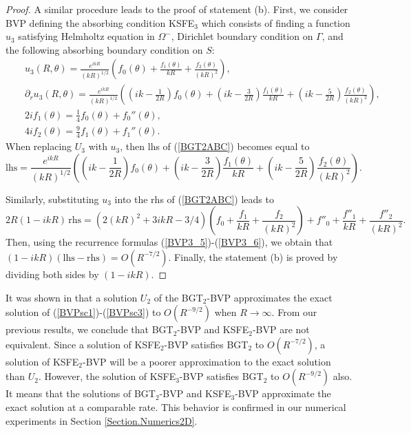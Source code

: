 \documentclass[final,3p,times,12pt]{elsarticle}
\begin{document}
\begin{proof}
A similar procedure leads to the proof of statement (b). First, we consider BVP defining the absorbing condition KSFE$_3$ which consists of finding a function $u_3$ satisfying Helmholtz equation in $\Omega^{-}$, Dirichlet boundary condition on $\Gamma$, and the following absorbing boundary condition on $S$:
\begin{eqnarray}
&& u_3(R,\theta)= \frac{e^{ikR}}{(kR)^{1/2}}\left(f_0(\theta) + \frac{f_1(\theta)}{kR} +  \frac{f_2(\theta)}{(kR)^{2}}\right), \label{BVP3_3} \\
&& \partial_{r} u_3(R,\theta) = \frac{e^{ikR}}{(kR)^{1/2}} \left( \left( ik - \frac{1}{2R} \right) f_{0}(\theta) + \left( ik - \frac{3}{2R} \right) \frac{f_{1}(\theta)}{kR} + \left( ik - \frac{5}{2R} \right) \frac{f_{2}(\theta)}{(kR)^2} \right),\label{BVP3_4} \\
&& 2i f_1(\theta) = \frac{1}{4}f_0(\theta) + f_0''(\theta), \label{BVP3_5} \\
&& 4i f_2(\theta) = \frac{9}{4}f_1(\theta) + f_1''(\theta). \label{BVP3_6}
\end{eqnarray}
When replacing $U_3$ with $u_3$, then lhs of (\ref{BGT2ABC}) becomes equal to
\begin{equation}
\text{lhs} = \frac{e^{ikR}}{(kR)^{1/2}} \left( \left( ik - \frac{1}{2R} \right) f_{0}(\theta) + \left( ik - \frac{3}{2R} \right) \frac{f_{1}(\theta)}{kR} + \left( ik - \frac{5}{2R} \right) \frac{f_{2}(\theta)}{(kR)^2} \right). \label{lhs3}
\end{equation}

Similarly, substituting $u_3$ into the rhs of (\ref{BGT2ABC}) leads to
\begin{equation}
2R (1 - ikR) \, \text{rhs} = \left( 2 (kR)^2 + 3ikR - 3/4 \right) \left( f_0 + \frac{f_1}{kR} + \frac{f_{2}}{(kR)^2} \right) + f''_0 + \frac{f''_1}{kR} + \frac{f''_2}{(kR)^2}.  \label{rhs3}
\end{equation}
Then, using the recurrence formulas (\ref{BVP3_5})-(\ref{BVP3_6}), we obtain that $(1 - ikR)\left( \text{lhs} - \text{rhs} \right) = O (R^{-7/2})$.
Finally, the statement (b) is proved by dividing both sides by $(1 - ikR)$.
\end{proof}

It was shown in \cite{Bayliss01} that a solution $U_2$ of the BGT$_2$-BVP approximates the exact solution of (\ref{BVPsc1})-(\ref{BVPsc3}) to $O (R^{-9/2} )$ when $R\rightarrow\infty$. From our previous results, 
we conclude that BGT$_2$-BVP and KSFE$_2$-BVP are not equivalent. Since a solution of KSFE$_2$-BVP satisfies BGT$_2$  to $O(R^{-7/2})$, a solution of KSFE$_2$-BVP will be a poorer approximation to the exact solution than $U_2$. However, the solution of KSFE$_3$-BVP satisfies BGT$_2$ to $O (R^{-9/2})$ also. It means that the solutions of BGT$_2$-BVP and KSFE$_3$-BVP approximate the exact solution at a comparable rate. This behavior is confirmed in our numerical experiments in Section \ref{Section.Numerics2D}. 
\end{document}
